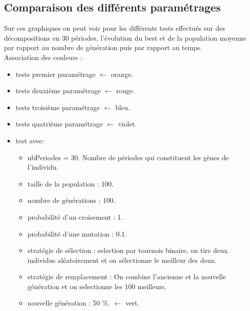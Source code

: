 \documentclass[a4paper]{report}
\begin{document}
\subsection{Comparaison des différents paramétrages} 
Sur ces graphiques on peut voir pour les différents tests effectués sur des décompositions en 30 périodes, l'évolution du best et de la population moyenne par rapport au nombre de génération puis par rapport au temps.\\
Association des couleurs :\\
\begin{itemize}
  \item tests premier paramétrage $\leftarrow $ orange.\\
  \item tests deuxième paramétrage $\leftarrow $ rouge.\\
  \item tests troisième paramétrage $\leftarrow $ bleu.\\
  \item tests quatrième paramétrage $\leftarrow $ violet.\\
  \item test avec:\\
  \begin{itemize}
\item nbPeriodes = 30. Nombre de périodes qui constituent les gènes de l'individu.
\item taille de la population : 100.
\item nombre de générations : 100.
\item probabilité d'un croisement : 1.
\item probabilité d'une mutation : 0.1.
\item stratégie de sélection : selection par tournois binaire, on tire deux individus aléatoirement et on sélectionne le meilleur des deux.
\item stratégie de remplacement : On combine l'ancienne et la nouvelle génération et on selectionne les 100 meilleurs.
\item nouvelle génération : 50 $\%$. $\leftarrow $ vert.\\

\end{itemize}
\end{itemize}
\end{document}
